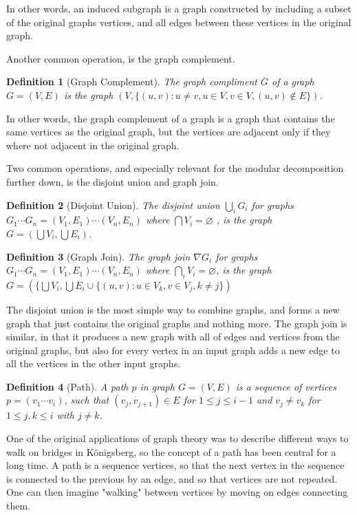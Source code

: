 \documentclass[a4paper]{article}
\newtheorem{definition}{Definition}[section]
\begin{document}
In other words, an induced subgraph is a graph constructed by including a
subset of the original graphs vertices, and all edges between these vertices in
the original graph.

Another common operation, is the graph complement.
\begin{definition}[Graph Complement]
    The graph compliment $\overline{G}$ of a graph $G = (V,E)$ is the graph 
    $(V,\{ (u,v) : u \neq v, u \in V,v \in V, (u,v) \notin E \})$.
\end{definition}

In other words, the graph complement of a
graph is a graph that contains the same vertices as the original graph, but the
vertices are adjacent only if they where not adjacent in the original graph.

Two common operations, and especially relevant for the modular decomposition
further down, is the disjoint union and graph join.
\begin{definition}[Disjoint Union]
    The disjoint union $\bigcup_i G_i$ for graphs 
    $G_1 \cdots G_n = (V_1,E_1) \cdots (V_n,E_n)$ where 
    $\bigcap V_i = \varnothing $ , is the graph
    $G = \left( \bigcup V_i,\bigcup E_i \right)$.
\end{definition}

\begin{definition}[Graph Join]
    The graph join $\nabla G_i$ for graphs $G_1 \cdots G_n = (V_1,E_1) \cdots (V_n,E_n)$ where 
    $\bigcap_i V_i = \varnothing$, is the graph $G = (\{\bigcup V_i,
    \bigcup E_i \cup \{(u,v) : u \in V_k, v \in V_j, k \neq j \})$
\end{definition}

 The disjoint union is the
most simple way to combine graphs, and forms a new graph that just
contains the original graphs and nothing more.  The graph join is similar, in
that it produces a new graph with all of edges and vertices from the original
graphs, but also for every vertex in an input graph adds a new edge to all the vertices in the other
input graphs.



\begin{definition}[Path]
    A path $p$ in graph $G = (V,E)$ is a sequence of vertices $p = (v_1\cdots
    v_i)$, such that $(v_j,v_{j+1}) \in E$ for $1 \leq j \leq i-1$ and $v_j \neq v_k$ 
    for $1 \leq j,k \leq i$ with $j \neq k$.
\end{definition}

One of the original applications of graph theory was to describe different ways
to walk on bridges in Königsberg, so the concept of a path has been central for
a long time.  A path is a sequence vertices, so that the next vertex in the
sequence is connected to the previous by an edge, and so that vertices are not
repeated.  One can then imagine "walking" between vertices by moving on edges
connecting them.  
\end{document}
